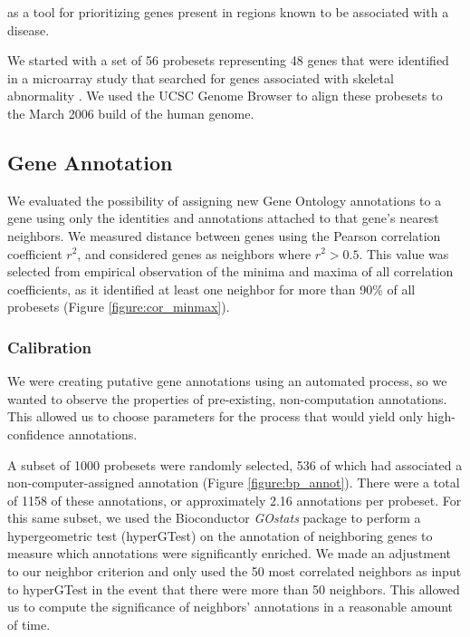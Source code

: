 \documentclass{article}
\begin{document}
 as a tool for prioritizing genes present in regions
known to be associated with a disease.


  We started with a set of 56 probesets
representing 48 genes that were identified in a microarray study that searched
for genes associated with skeletal abnormality \cite{funari}.  We used the UCSC
Genome Browser \cite{karolchik} to align these probesets to the March 2006
build of the human genome.

\subsection{Gene Annotation}\label{Annotation Results}

We evaluated the possibility of assigning new Gene Ontology annotations to a
gene using only the identities and annotations attached to that gene's nearest
neighbors.  We measured distance between genes using the Pearson correlation
coefficient $r^2$, and considered genes as neighbors where $r^2 > 0.5$.  This
value was selected from empirical observation of the minima and maxima of all
correlation coefficients, as it identified at least one neighbor for more than
90\% of all probesets (Figure \ref{figure:cor_minmax}).

\subsubsection{Calibration}\label{Calibration}

We were creating putative gene annotations using an automated process, so we
wanted to observe the properties of pre-existing, non-computation annotations.
This allowed us to choose parameters for the process that would yield only
high-confidence annotations.

A subset of 1000 probesets were randomly selected, 536 of which had associated
a non-computer-assigned annotation (Figure \ref{figure:bp_annot}).  There were
a total of 1158 of these annotations, or approximately 2.16 annotations per
probeset.  For this same subset, we used the Bioconductor \emph{GOstats}
package to perform a hypergeometric test (hyperGTest) on the annotation of
neighboring genes to measure which annotations were significantly enriched.  We
made an adjustment to our neighbor criterion and only used the 50 most
correlated neighbors as input to hyperGTest in the event that there were more
than 50 neighbors.  This allowed us to compute the significance of neighbors'
annotations in a reasonable amount of time.
\end{document}
